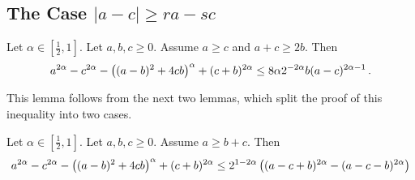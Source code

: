 \subsection{The Case $|a-c| \geq ra-sc$}\label{ssec:rascleqac}
%
\begin{lemma}[Case 1.2]
	Let $\alpha\in[\frac12,1]$.
	Let $a,b,c\geq0$.
	Assume $a \geq c$ and $a+c\geq 2b$.
	Then 
	\begin{equation*}
		a^{2\alpha}-c^{2\alpha}-\left( (a-b)^2+4cb \right)^{\alpha}+(c+b)^{2\alpha} \leq 8\alpha 2^{-2\alpha} b (a-c)^{2\alpha-1}
		\, .
	\end{equation*}
\end{lemma}
%
This lemma follows from the next two lemmas, which split the proof of this inequality into two cases.
%
\begin{lemma}
	Let $\alpha\in[\frac12,1]$.
	Let $a,b,c\geq0$.
	Assume $a \geq b+c$.
	Then 
	\begin{equation*}
		a^{2\alpha}-c^{2\alpha}-\left( (a-b)^2+4cb \right)^{\alpha}+(c+b)^{2\alpha} 
		\leq 
		2^{1-2\alpha} \left( 	(a-c + b)^{2\alpha}  -  (a-c - b)^{2\alpha} \right)
	\end{equation*}
\end{lemma}
%
